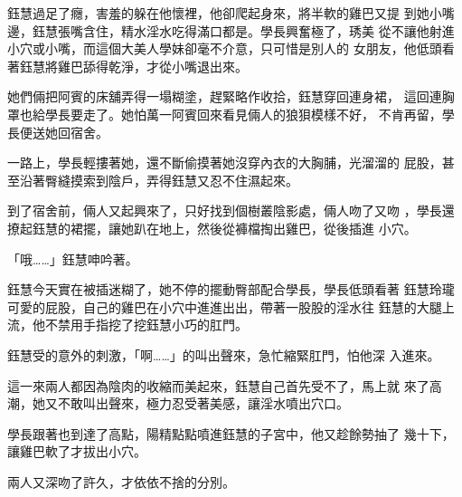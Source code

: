 鈺慧過足了癮，害羞的躲在他懷裡，他卻爬起身來，將半軟的雞巴又提
到她小嘴邊，鈺慧張嘴含住，精水淫水吃得滿口都是。學長興奮極了，琇美
從不讓他射進小穴或小嘴，而這個大美人學妹卻毫不介意，只可惜是別人的
女朋友，他低頭看著鈺慧將雞巴舔得乾淨，才從小嘴退出來。

她們倆把阿賓的床舖弄得一塌糊塗，趕緊略作收拾，鈺慧穿回連身裙，
這回連胸罩也給學長要走了。她怕萬一阿賓回來看見倆人的狼狽模樣不好，
不肯再留，學長便送她回宿舍。

一路上，學長輕摟著她，還不斷偷摸著她沒穿內衣的大胸脯，光溜溜的
屁股，甚至沿著臀縫摸索到陰戶，弄得鈺慧又忍不住濕起來。

到了宿舍前，倆人又起興來了，只好找到個樹叢陰影處，倆人吻了又吻
，學長還撩起鈺慧的裙擺，讓她趴在地上，然後從褲檔掏出雞巴，從後插進
小穴。

「哦……」鈺慧呻吟著。

鈺慧今天實在被插迷糊了，她不停的擺動臀部配合學長，學長低頭看著
鈺慧玲瓏可愛的屁股，自己的雞巴在小穴中進進出出，帶著一股股的淫水往
鈺慧的大腿上流，他不禁用手指挖了挖鈺慧小巧的肛門。

鈺慧受的意外的刺激，「啊……」的叫出聲來，急忙縮緊肛門，怕他深
入進來。

這一來兩人都因為陰肉的收縮而美起來，鈺慧自己首先受不了，馬上就
來了高潮，她又不敢叫出聲來，極力忍受著美感，讓淫水噴出穴口。

學長跟著也到達了高點，陽精點點噴進鈺慧的子宮中，他又趁餘勢抽了
幾十下，讓雞巴軟了才拔出小穴。

兩人又深吻了許久，才依依不捨的分別。










